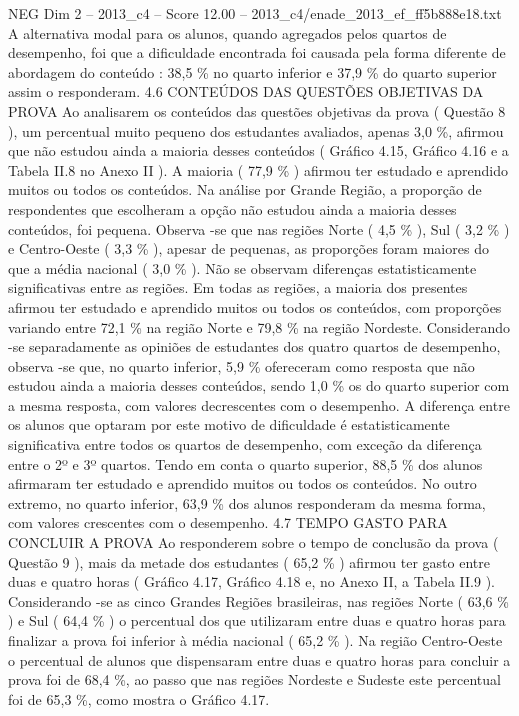 \begin{textsample}{NEG Dim 2 – 2013\_c4 – Score 12.00 – 2013\_c4/enade\_2013\_ef\_ff5b888e18.txt}
A alternativa modal para os alunos, quando agregados pelos quartos de desempenho, foi que a dificuldade encontrada foi causada pela forma diferente de abordagem do conteúdo : 38,5 \% no quarto inferior e 37,9 \% do quarto superior assim o responderam. 4.6 CONTEÚDOS DAS QUESTÕES OBJETIVAS DA PROVA Ao analisarem os conteúdos das questões objetivas da prova ( Questão 8 ), um percentual muito pequeno dos estudantes avaliados, apenas 3,0 \%, afirmou que não estudou ainda a maioria desses conteúdos ( Gráfico 4.15, Gráfico 4.16 e a Tabela II.8 no Anexo II ).
A maioria ( 77,9 \% ) afirmou ter estudado e aprendido muitos ou todos os conteúdos.
Na análise por Grande Região, a proporção de respondentes que escolheram a opção não estudou ainda a maioria desses conteúdos, foi pequena.
Observa -se que nas regiões Norte ( 4,5 \% ), Sul ( 3,2 \% ) e Centro-Oeste ( 3,3 \% ), apesar de pequenas, as proporções foram maiores do que a média nacional ( 3,0 \% ).
Não se observam diferenças estatisticamente significativas entre as regiões.
Em todas as regiões, a maioria dos presentes afirmou ter estudado e aprendido muitos ou todos os conteúdos, com proporções variando entre 72,1 \% na região Norte e 79,8 \% na região Nordeste.
Considerando -se separadamente as opiniões de estudantes dos quatro quartos de desempenho, observa -se que, no quarto inferior, 5,9 \% ofereceram como resposta que não estudou ainda a maioria desses conteúdos, sendo 1,0 \% os do quarto superior com a mesma resposta, com valores decrescentes com o desempenho.
A diferença entre os alunos que optaram por este motivo de dificuldade é estatisticamente significativa entre todos os quartos de desempenho, com exceção da diferença entre o 2º e 3º quartos.
Tendo em conta o quarto superior, 88,5 \% dos alunos afirmaram ter estudado e aprendido muitos ou todos os conteúdos.
No outro extremo, no quarto inferior, 63,9 \% dos alunos responderam da mesma forma, com valores crescentes com o desempenho. 4.7 TEMPO GASTO PARA CONCLUIR A PROVA Ao responderem sobre o tempo de conclusão da prova ( Questão 9 ), mais da metade dos estudantes ( 65,2 \% ) afirmou ter gasto entre duas e quatro horas ( Gráfico 4.17, Gráfico 4.18 e, no Anexo II, a Tabela II.9 ).
Considerando -se as cinco Grandes Regiões brasileiras, nas regiões Norte ( 63,6 \% ) e Sul ( 64,4 \% ) o percentual dos que utilizaram entre duas e quatro horas para finalizar a prova foi inferior à média nacional ( 65,2 \% ).
Na região Centro-Oeste o percentual de alunos que dispensaram entre duas e quatro horas para concluir a prova foi de 68,4 \%, ao passo que nas regiões Nordeste e Sudeste este percentual foi de 65,3 \%, como mostra o Gráfico 4.17.

\end{textsample}
